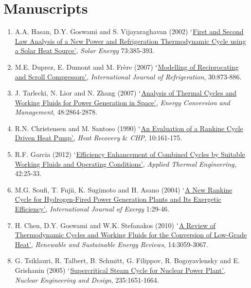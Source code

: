 \documentclass[14pts,a4paper,amsmath,amssymb,floatfix]{article}%
\begin{document}
\clearpage

\section{Manuscripts}

\begin{enumerate}
%
\item A.A. Hasan, D.Y. Goswami and S. Vijayaraghavan (2002) \href{http://dx.doi.org/10.1016/S0038-092X(02)00113-5}{$\lq$First and Second Law Analysis of a New Power and Refrigeration Thermodynamic Cycle using a Solar Heat Source'}, {\it Solar Energy} 73:385-393.
%
\item M.E. Duprez, E. Dumont and M. Fr\`ere (2007) \href{http://dx.doi.org/10.1016/j.ijrefrig.2006.11.014}{$\lq$Modelling of Reciprocating and Scroll Compressors'}, {\it International Journal of Refrigeration}, 30:873-886.
%
\item J. Tarlecki, N. Lior and N. Zhang (2007) \href{http://dx.doi.org/10.1016/j.enconman.2007.06.039}{$\lq$Analysis of Thermal Cycles and Working Fluids for Power Generation in Space'}, {\it Energy Conversion and Management}, 48:2864-2878.
%
\item R.N. Christensen and M. Santoso (1990) \href{http://dx.doi.org/10.1016/0890-4332(90)90169-K}{$\lq$An Evaluation of a Rankine Cycle Driven Heat Pump'}, {\it Heat Recovery $\&$ CHP}, 10:161-175.
%
\item R.F. Garcia (2012) \href{http://dx.doi.org/10.1016/j.applthermaleng.2012.02.039}{$\lq$Efficiency Enhancement of Combined Cycles by Suitable Working Fluids and Operating Conditions'}, {\it Applied Thermal Engineering}, 42:25-33.
%
\item M.G. Soufi, T. Fujii, K. Sugimoto and H. Asano (2004) \href{http://inderscience.metapress.com/content/vvmpkbwp3x0fk08c/?genre=article&issn=1742-8297&volume=1&issue=1&spage=29}{$\lq$A New Rankine Cycle for Hydrogen-Fired Power Generation Plants and Its Exergetic Efficiency'}, {\it International Journal of Exergy} 1:29-46.
%
\item H. Chen, D.Y. Goswami and W.K. Stefanakos (2010) \href{http://dx.doi.org/10.1016/j.rser.2010.07.006}{$\lq$A Review of Thermodynamic Cycles and Working Fluids for the Conversion of Low-Grade Heat'}, {\it Renewable and Sustainable Energy Reviews}, 14:3059-3067.
%
\item G. Tsiklauri, R. Talbert, B. Schmitt, G. Filippov, R. Bogoyavlensky and E. Grishanin (2005) \href{http://dx.doi.org/10.1016/j.nucengdes.2004.11.016}{$\lq$Supercritical Steam Cycle for Nuclear Power Plant'}, {\it Nuclear Engineering and Design}, 235:1651-1664.

\end{enumerate}
\end{document}
